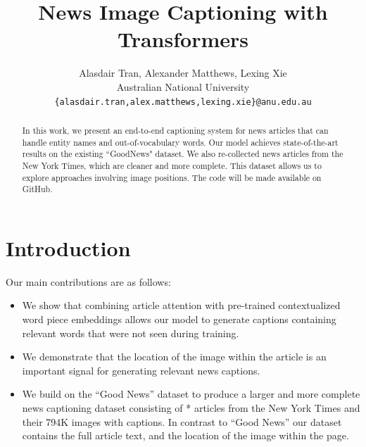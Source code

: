 \documentclass[10pt,twocolumn,letterpaper]{article}
\begin{document}
\title{News Image Captioning with Transformers}

\author{Alasdair Tran, Alexander Matthews, Lexing Xie\\
Australian National University\\
{\tt\small \{alasdair.tran,alex.matthews,lexing.xie\}@anu.edu.au}
}

\maketitle

\begin{abstract}
   In this work, we present an end-to-end captioning system for news articles
   that can handle entity names and out-of-vocabulary words. Our model achieves
   state-of-the-art results on the existing ``GoodNews" dataset. We also
   re-collected news articles from the New York Times, which are cleaner and
   more complete. This dataset allows us to explore approaches involving
   image positions. The code will be made available on GitHub.
\end{abstract}

\section{Introduction}

Our main contributions are as follows:

\begin{itemize}
   \item We show that combining article attention with pre-trained contextualized
   word piece embeddings allows our model to generate captions containing
   relevant words that were not seen during training.

   \item We demonstrate that the location of the image within the article is an
   important signal for generating relevant news captions.

   \item We build on the “Good News” dataset to produce a larger and more complete
   news captioning dataset consisting of * articles from the New York Times and
   their 794K images with captions. In contrast to “Good News” our dataset
   contains the full article text, and the location of the image within the
   page.
\end{itemize}
\end{document}
